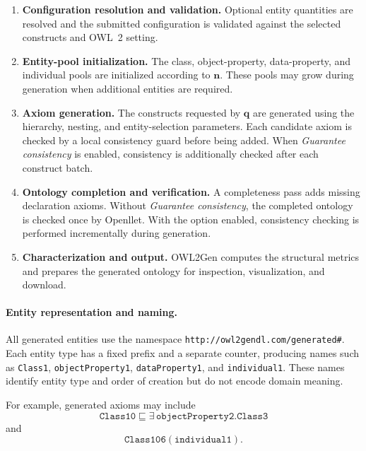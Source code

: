 \begin{enumerate}[label=\roman*)]

\item \textbf{Configuration resolution and validation.}
Optional entity quantities are resolved and the submitted configuration
is validated against the selected constructs and OWL~2 setting.

\item \textbf{Entity-pool initialization.}
The class, object-property, data-property, and individual pools are
initialized according to $\mathbf{n}$. These pools may grow during
generation when additional entities are required.

\item \textbf{Axiom generation.}
The constructs requested by $\mathbf{q}$ are generated using the hierarchy,
nesting, and entity-selection parameters. Each candidate axiom is checked
by a local consistency guard before being added. When
\emph{Guarantee consistency} is enabled, consistency is additionally
checked after each construct batch.

\item \textbf{Ontology completion and verification.}
A completeness pass adds missing declaration axioms. Without
\emph{Guarantee consistency}, the completed ontology is checked once by
Openllet. With the option enabled, consistency checking is performed
incrementally during generation.

\item \textbf{Characterization and output.}
OWL2Gen computes the structural metrics and prepares the generated ontology
for inspection, visualization, and download.

\end{enumerate}


\paragraph{Entity representation and naming.}

All generated entities use the namespace
\texttt{http://owl2gendl.com/generated\#}. Each entity type has a fixed
prefix and a separate counter, producing names such as
\texttt{Class1}, \texttt{objectProperty1}, \texttt{dataProperty1}, and
\texttt{individual1}. These names identify entity type and order of
creation but do not encode domain meaning.

For example, generated axioms may include
\[
\texttt{Class10}\sqsubseteq
\exists\,\texttt{objectProperty2}.\texttt{Class3}
\]
and
\[
\texttt{Class106}(\texttt{individual1}).
\]

